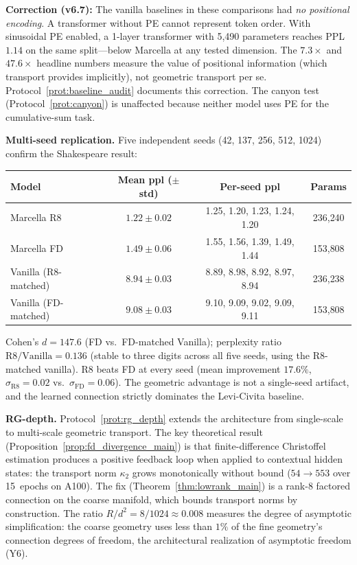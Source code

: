 \documentclass[11pt,a4paper]{article}
\theoremstyle{definition}
\theoremstyle{remark}
\begin{document}
\textbf{Correction (v6.7):} The vanilla baselines in these 
comparisons had \emph{no positional encoding}. A transformer 
without PE cannot represent token order. With sinusoidal PE 
enabled, a 1-layer transformer with 5{,}490 parameters 
reaches PPL~$1.14$ on the same split---below Marcella at any 
tested dimension. The $7.3\times$ and $47.6\times$ headline 
numbers measure the value of positional information (which 
transport provides implicitly), not geometric transport per se. 
Protocol~\ref{prot:baseline_audit} documents this correction. 
The canyon test (Protocol~\ref{prot:canyon}) is unaffected 
because neither model uses PE for the cumulative-sum task.

\medskip

\textbf{Multi-seed replication.} Five independent seeds 
(42, 137, 256, 512, 1024) confirm the Shakespeare result:
\begin{center}
\begin{tabular}{lccc}
\toprule
Model & Mean ppl ($\pm$ std) & Per-seed ppl & Params \\
\midrule
Marcella R8 & $\mathbf{1.22 \pm 0.02}$ & 
  1.25, 1.20, 1.23, 1.24, 1.20 & 236{,}240 \\
Marcella FD & $1.49 \pm 0.06$ & 
  1.55, 1.56, 1.39, 1.49, 1.44 & 153{,}808 \\
Vanilla (R8-matched) & $8.94 \pm 0.03$ & 
  8.89, 8.98, 8.92, 8.97, 8.94 & 236{,}238 \\
Vanilla (FD-matched) & $9.08 \pm 0.03$ & 
  9.10, 9.09, 9.02, 9.09, 9.11 & 153{,}808 \\
\bottomrule
\end{tabular}
\end{center}
Cohen's $d = 147.6$ (FD vs.\ FD-matched Vanilla); perplexity ratio 
$\text{R8}/\text{Vanilla} = 0.136$ (stable to three 
digits across all five seeds, using the R8-matched vanilla). 
R8 beats FD at every seed 
(mean improvement $17.6\%$, $\sigma_{\text{R8}} = 0.02$ vs.\ 
$\sigma_{\text{FD}} = 0.06$). The geometric advantage is not 
a single-seed artifact, and the learned connection strictly 
dominates the Levi-Civita baseline.

\medskip

\textbf{RG-depth.} Protocol~\ref{prot:rg_depth} extends the 
architecture from single-scale to multi-scale geometric transport. 
The key theoretical result 
(Proposition~\ref{prop:fd_divergence_main}) is that 
finite-difference Christoffel estimation produces a positive 
feedback loop when applied to contextual hidden states: the 
transport norm $\kappa_2$ grows monotonically without bound 
($54 \to 553$ over 15~epochs on A100). The fix 
(Theorem~\ref{thm:lowrank_main}) is a rank-8 factored connection 
on the coarse manifold, which bounds transport norms by 
construction. The ratio $R/d^2 = 8/1024 \approx 0.008$ 
measures the degree of asymptotic simplification: the coarse 
geometry uses less than $1\%$ of the fine geometry's connection 
degrees of freedom, the architectural realization of asymptotic 
freedom (Y6).
\end{document}
